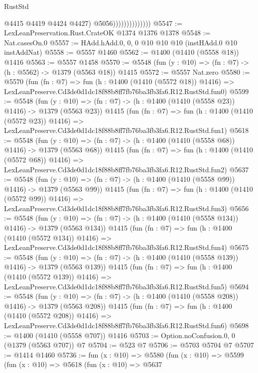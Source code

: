 \begin{lexlean}{RustStd}
\begin{coremodule}
                                  @4415
                                  @4419
                                  @4424
                                  @4427)
                                @5056))))))))))))))
@5547 := LexLeanPreservation.Rust.CrateOK @1374 @1376 @1378
@5548 := Nat.casesOn.{0}
@5557 := HAdd.hAdd.{0, 0, 0} @10 @10 @10 (instHAdd.{0} @10 instAddNat)
@5558 := @5557 @1460
@5562 := @1400 (@1410 (@5558 @18)) @1416
@5563 := @5557 @1458
@5570 := @5548 (fun (y : @10) => (fn : @7) -> (h : @5562) -> @1379 (@5563 @18)) @1415
@5572 := @5557 Nat.zero
@5580 := @5570
    (fun (fn : @7) =>
    fun (h : @1400 (@1410 (@5572 @18)) @1416) =>
    LexLeanPreserve.Cd3de0d1dc18f88b8ff7fb76ba3fb3fa6.R12.RustStd.fun0)
@5599 := @5548
    (fun (y : @10) => (fn : @7) -> (h : @1400 (@1410 (@5558 @23)) @1416) -> @1379 (@5563 @23))
    @1415
    (fun (fn : @7) =>
    fun (h : @1400 (@1410 (@5572 @23)) @1416) =>
    LexLeanPreserve.Cd3de0d1dc18f88b8ff7fb76ba3fb3fa6.R12.RustStd.fun1)
@5618 := @5548
    (fun (y : @10) => (fn : @7) -> (h : @1400 (@1410 (@5558 @68)) @1416) -> @1379 (@5563 @68))
    @1415
    (fun (fn : @7) =>
    fun (h : @1400 (@1410 (@5572 @68)) @1416) =>
    LexLeanPreserve.Cd3de0d1dc18f88b8ff7fb76ba3fb3fa6.R12.RustStd.fun2)
@5637 := @5548
    (fun (y : @10) => (fn : @7) -> (h : @1400 (@1410 (@5558 @99)) @1416) -> @1379 (@5563 @99))
    @1415
    (fun (fn : @7) =>
    fun (h : @1400 (@1410 (@5572 @99)) @1416) =>
    LexLeanPreserve.Cd3de0d1dc18f88b8ff7fb76ba3fb3fa6.R12.RustStd.fun3)
@5656 := @5548
    (fun (y : @10) => (fn : @7) -> (h : @1400 (@1410 (@5558 @134)) @1416) -> @1379 (@5563 @134))
    @1415
    (fun (fn : @7) =>
    fun (h : @1400 (@1410 (@5572 @134)) @1416) =>
    LexLeanPreserve.Cd3de0d1dc18f88b8ff7fb76ba3fb3fa6.R12.RustStd.fun4)
@5675 := @5548
    (fun (y : @10) => (fn : @7) -> (h : @1400 (@1410 (@5558 @139)) @1416) -> @1379 (@5563 @139))
    @1415
    (fun (fn : @7) =>
    fun (h : @1400 (@1410 (@5572 @139)) @1416) =>
    LexLeanPreserve.Cd3de0d1dc18f88b8ff7fb76ba3fb3fa6.R12.RustStd.fun5)
@5694 := @5548
    (fun (y : @10) => (fn : @7) -> (h : @1400 (@1410 (@5558 @208)) @1416) -> @1379 (@5563 @208))
    @1415
    (fun (fn : @7) =>
    fun (h : @1400 (@1410 (@5572 @208)) @1416) =>
    LexLeanPreserve.Cd3de0d1dc18f88b8ff7fb76ba3fb3fa6.R12.RustStd.fun6)
@5698 := @1400 (@1410 (@5558 @707)) @1416
@5703 := Option.noConfusion.{0, 0} (@1379 (@5563 @707)) @7
@5704 := @523 @7
@5706 := @5703 @5704 @7
@5707 := @1414 @1460
@5736 := fun (x : @10) =>
  @5580
    (fun (x : @10) =>
    @5599
      (fun (x : @10) =>
      @5618
        (fun (x : @10) =>
        @5637

\end{coremodule}
\end{lexlean}
